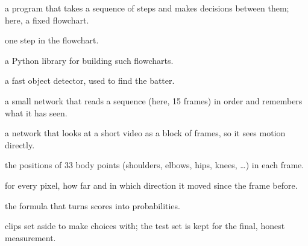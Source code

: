 \documentclass[11pt,a4paper]{article}
\begin{document}
\begin{description}[nosep, leftmargin=1.6em, font=\normalfont\bfseries]
  \item[Agent] a program that takes a sequence of steps and makes
        decisions between them; here, a fixed flowchart.
  \item[Node] one step in the flowchart.
  \item[LangGraph] a Python library for building such flowcharts.
  \item[YOLO] a fast object detector, used to find the batter.
  \item[GRU] a small network that reads a sequence (here, 15 frames) in
        order and remembers what it has seen.
  \item[3D CNN] a network that looks at a short video as a block of
        frames, so it sees motion directly.
  \item[Pose] the positions of 33 body points (shoulders, elbows, hips,
        knees, \dots) in each frame.
  \item[Optical flow] for every pixel, how far and in which direction it
        moved since the frame before.
  \item[Softmax] the formula that turns scores into probabilities.
  \item[Validation set] clips set aside to make choices with; the test set
        is kept for the final, honest measurement.
\end{description}
\end{document}
